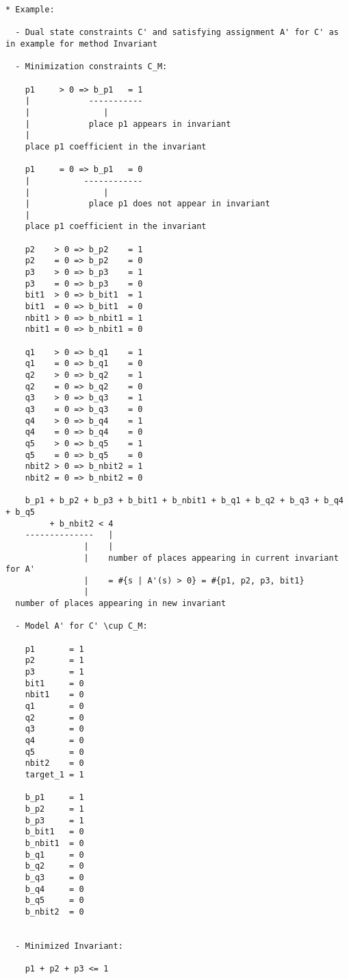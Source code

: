 \documentclass{llncs}
\begin{document}
\begin{verbatim}
* Example:

  - Dual state constraints C' and satisfying assignment A' for C' as in example for method Invariant

  - Minimization constraints C_M:

    p1     > 0 => b_p1   = 1
    |            -----------
    |               |
    |            place p1 appears in invariant
    |
    place p1 coefficient in the invariant

    p1     = 0 => b_p1   = 0
    |           ------------
    |               |
    |            place p1 does not appear in invariant
    |
    place p1 coefficient in the invariant

    p2    > 0 => b_p2    = 1
    p2    = 0 => b_p2    = 0
    p3    > 0 => b_p3    = 1
    p3    = 0 => b_p3    = 0
    bit1  > 0 => b_bit1  = 1
    bit1  = 0 => b_bit1  = 0
    nbit1 > 0 => b_nbit1 = 1
    nbit1 = 0 => b_nbit1 = 0

    q1    > 0 => b_q1    = 1
    q1    = 0 => b_q1    = 0
    q2    > 0 => b_q2    = 1
    q2    = 0 => b_q2    = 0
    q3    > 0 => b_q3    = 1
    q3    = 0 => b_q3    = 0
    q4    > 0 => b_q4    = 1
    q4    = 0 => b_q4    = 0
    q5    > 0 => b_q5    = 1
    q5    = 0 => b_q5    = 0
    nbit2 > 0 => b_nbit2 = 1
    nbit2 = 0 => b_nbit2 = 0

    b_p1 + b_p2 + b_p3 + b_bit1 + b_nbit1 + b_q1 + b_q2 + b_q3 + b_q4 + b_q5
         + b_nbit2 < 4
    --------------   |
                |    |
                |    number of places appearing in current invariant for A'
                |    = #{s | A'(s) > 0} = #{p1, p2, p3, bit1}
                |
  number of places appearing in new invariant
  
  - Model A' for C' \cup C_M:

    p1       = 1
    p2       = 1
    p3       = 1
    bit1     = 0
    nbit1    = 0
    q1       = 0
    q2       = 0
    q3       = 0
    q4       = 0
    q5       = 0
    nbit2    = 0
    target_1 = 1
    
    b_p1     = 1
    b_p2     = 1
    b_p3     = 1
    b_bit1   = 0
    b_nbit1  = 0
    b_q1     = 0
    b_q2     = 0
    b_q3     = 0
    b_q4     = 0
    b_q5     = 0
    b_nbit2  = 0
    
    
  - Minimized Invariant:

    p1 + p2 + p3 <= 1
\end{verbatim}
    
\newpage
\end{document}
